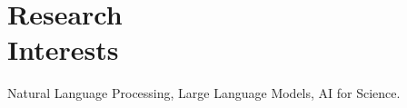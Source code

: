 \section{Research \\ Interests}



\noindent Natural Language Processing, Large Language Models, AI for Science. \\


